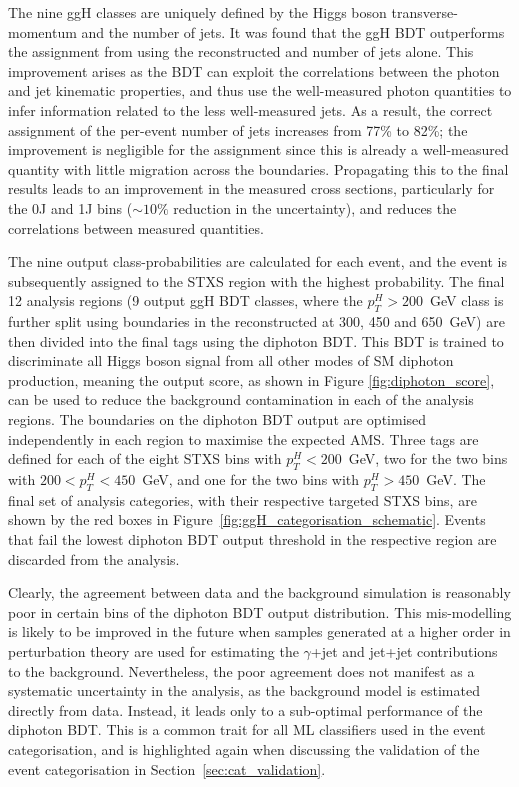 The nine ggH classes are uniquely defined by the Higgs boson transverse-momentum and the number of jets. It was found that the ggH BDT outperforms the assignment from using the reconstructed \ptgg and number of jets alone. This improvement arises as the BDT can exploit the correlations between the photon and jet kinematic properties, and thus use the well-measured photon quantities to infer information related to the less well-measured jets. As a result, the correct assignment of the per-event number of jets increases from 77\% to 82\%; the improvement is negligible for the \ptgg assignment since this is already a well-measured quantity with little migration across the \ptH boundaries. Propagating this to the final results leads to an improvement in the measured cross sections, particularly for the 0J and 1J bins ($\sim 10\%$ reduction in the uncertainty), and reduces the correlations between measured quantities.

The nine output class-probabilities are calculated for each event, and the event is subsequently assigned to the STXS region with the highest probability. The final 12 analysis regions (9 output ggH BDT classes, where the $p_T^H>200$~GeV class is further split using boundaries in the reconstructed \ptgg at 300, 450 and 650~GeV) are then divided into the final tags using the diphoton BDT. This BDT is trained to discriminate all Higgs boson signal from all other modes of SM diphoton production, meaning the output score, as shown in Figure \ref{fig:diphoton_score}, can be used to reduce the background contamination in each of the analysis regions. The boundaries on the diphoton BDT output are optimised independently in each region to maximise the expected AMS. Three tags are defined for each of the eight STXS bins with $p_T^H<200$~GeV, two for the two bins with ${200<p_T^H<450}$~GeV, and one for the two bins with $p_T^H>450$~GeV. The final set of analysis categories, with their respective targeted STXS bins, are shown by the red boxes in Figure~\ref{fig:ggH_categorisation_schematic}. Events that fail the lowest diphoton BDT output threshold in the respective region are discarded from the analysis. 

Clearly, the agreement between data and the background simulation is reasonably poor in certain bins of the diphoton BDT output distribution. This mis-modelling is likely to be improved in the future when samples generated at a higher order in perturbation theory are used for estimating the $\gamma$+jet and jet+jet contributions to the background. Nevertheless, the poor agreement does not manifest as a systematic uncertainty in the analysis, as the background model is estimated directly from data. Instead, it leads only to a sub-optimal performance of the diphoton BDT. This is a common trait for all ML classifiers used in the event categorisation, and is highlighted again when discussing the validation of the event categorisation in Section~\ref{sec:cat_validation}.

